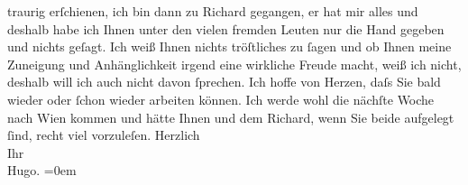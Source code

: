 \begin{ledgroupsized}[t]{13cm}
               traurig erſchienen, ich bin dann zu Richard
               gegangen, er hat mir alles \label{K_L00728_2v}\label{K_L00728_2h} und deshalb habe ich Ihnen
               unter den vielen fremden Leuten nur die Hand gegeben und nichts geſagt. Ich weiß
               Ihnen {\pb}nichts tröſtliches zu ſagen
               und ob Ihnen meine Zuneigung und Anhänglichkeit irgend eine wirkliche Freude macht,
               weiß ich nicht, deshalb will ich auch nicht davon ſprechen. Ich hoffe von Herzen,
               daſs Sie bald wieder oder ſchon wieder arbeiten können. Ich werde {\pb}wohl die nächſte Woche nach Wien kommen und hätte Ihnen und dem Richard, wenn Sie beide aufgelegt ſind, recht viel
               vorzuleſen.\pend
           \pstart
           Herzlich{\\[\baselineskip]}Ihr{\\[\baselineskip]}\spacefill\mbox{Hugo.}\pend
           \leftskip=0em{}\endnumbering{}\end{ledgroupsized}  \newcommand{\dateiname}{L00728}\newcommand{\titel}{Hugo von Hofmannsthal an Arthur Schnitzler, 3. 10. [1897]}\newcommand{\editorInnen}{Martin Anton Müller und Gerd-Hermann Susen}
            \footnotesize
\begin{ledgroupsized}[t]{11.5cm}
\end{ledgroupsized}
         
      
